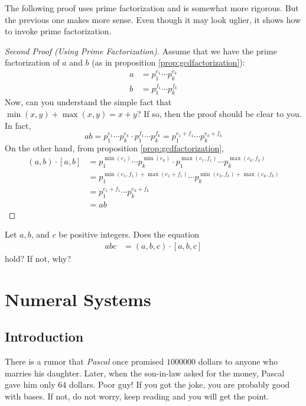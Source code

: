 The following proof uses prime factorization and is somewhat more rigorous. But the previous one makes more sense. Even though it may look uglier, it shows how to invoke prime factorization.
\begin{proof}[Second Proof (Using Prime Factorization)]
	Assume that we have the prime factorization of $a$ and $b$ (as in proposition \eqref{prop:gcdfactorization}):
	\begin{align*}
		a
			& =p_1^{e_1}\cdots p_k^{e_k}\\
		b
			& =p_1^{f_1}\cdots p_k^{f_k}
	\end{align*}
	Now, can you understand the simple fact that $\min(x,y)+\max(x,y)=x+y$? If so, then the proof should be clear to you. In fact,
	\[ab=p_1^{e_1}\cdots p_k^{e_k}\cdot p_1^{f_1}\cdots p_k^{f_k}=p_1^{e_1+f_1}\cdots p_k^{e_k+f_k}\]
	On the other hand, from proposition \eqref{prop:gcdfactorization},
	\begin{align*}
		(a,b)\cdot[a,b]
		& = p_1^{\min(e_1)}\cdots p_k^{\min(e_k)}\cdot p_1^{\max(e_1,f_1)}\cdots p_k^{\max(e_k,f_k)}\\
		& = p_1^{\min(e_1,f_1)+\max(e_1+f_1)}\cdots p_k^{\min(e_k,f_k)+\max(e_k,f_k)}\\
		& = p_1^{e_1+f_1}\cdots p_k^{e_k+f_k}\\
		& = ab
	\end{align*}
\end{proof}

\begin{question}
	Let $a,b$, and $c$ be positive integers. Does the equation
		\begin{align*}
			abc
				& =(a,b,c)\cdot[a,b,c]
		\end{align*}
	hold? If not, why?
\end{question}

\section{Numeral Systems}
\subsection{Introduction}
There is a rumor that \textit{Pascal} once promised $1000000$ dollars to anyone who marries his daughter. Later, when the son-in-law asked for the money, Pascal gave him only $64$ dollars. Poor guy! If you got the joke, you are probably good with bases. If not, do not worry, keep reading and you will get the point.

